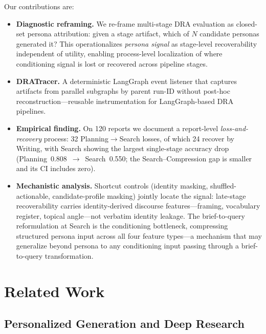\documentclass[]{article}
\begin{document}
Our contributions are:
\begin{itemize}
  \item \textbf{Diagnostic reframing.} We re-frame multi-stage DRA evaluation
  as closed-set persona attribution: given a stage artifact, which of $N$
  candidate personas generated it? This operationalizes \emph{persona signal}
  as stage-level recoverability independent of utility, enabling process-level
  localization of where conditioning signal is lost or recovered across pipeline stages.
  \item \textbf{DRATracer.} A deterministic LangGraph event listener that
  captures artifacts from parallel subgraphs by parent run-ID without
  post-hoc reconstruction---reusable instrumentation for LangGraph-based DRA pipelines.
  \item \textbf{Empirical finding.} On 120 reports we document a report-level
  \emph{loss-and-recovery} process: 32 Planning$\to$Search losses, of which
  24 recover by Writing, with Search showing the largest single-stage accuracy
  drop (Planning~0.808~$\to$~Search~0.550; the Search--Compression gap is smaller
  and its CI includes zero).
  \item \textbf{Mechanistic analysis.} Shortcut controls (identity masking,
  shuffled-actionable, candidate-profile masking) jointly locate the signal:
  late-stage recoverability carries identity-derived discourse
  features---framing, vocabulary register, topical angle---not verbatim
  identity leakage.
  The brief-to-query reformulation at Search is the conditioning bottleneck,
  compressing structured persona input across all four feature
  types---a mechanism that may generalize beyond persona to any conditioning
  input passing through a brief-to-query transformation.
\end{itemize}

\section{Related Work}
\label{sec:related}

\subsection{Personalized Generation and Deep Research}
\end{document}
